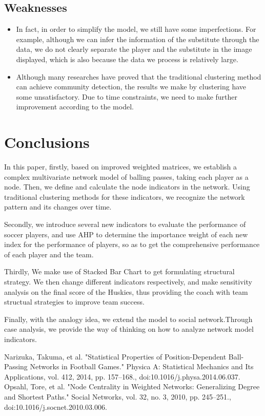 \documentclass{mcmthesis}
\begin{document}
{\subsection{Weaknesses}
\begin{itemize}
\item In fact, in order to simplify the model, we still have some imperfections. For example, although we can infer the information of the substitute through the data, we do not clearly separate the player and the substitute in the image displayed, which is also because the data we process is relatively large.
\item Although many researches have proved that the traditional clustering method can achieve community detection, the results we make by clustering have some unsatisfactory. Due to time constraints, we need to make further improvement according to the model.
\end{itemize}%



\section{Conclusions}
In this paper, firstly, based on improved weighted matrices, we establish a complex multivariate network model of balling passes, taking each player as a node. Then, we define and calculate the node indicators in the network. Using traditional clustering methods for these indicators, we recognize the network pattern and its changes over time.


Secondly, we introduce several new indicators to evaluate the performance of soccer players, and use AHP to determine the importance weight of each new index for the performance of players, so as to get the comprehensive performance of each player and the team.

Thirdly, We make use of Stacked Bar Chart to get formulating structural strategy. We then change different indicators respectively, and make sensitivity analysis on the final score of the Huskies, thus providing the coach with team structual strategies to improve team success.

Finally, with the analogy idea, we extend the model to social network.Through case analysis, we provide the way of thinking on how to analyze network model indicators.



\begin{thebibliography}{99}%
Narizuka, Takuma, et al. "Statistical Properties of Position-Dependent Ball-Passing Networks in Football Games." Physica A: Statistical Mechanics and Its Applications, vol. 412, 2014, pp. 157–168., doi:10.1016/j.physa.2014.06.037.
Opsahl, Tore, et al. "Node Centrality in Weighted Networks: Generalizing Degree and Shortest Paths." Social Networks, vol. 32, no. 3, 2010, pp. 245–251., doi:10.1016/j.socnet.2010.03.006.


\end{thebibliography}}
\end{document}
